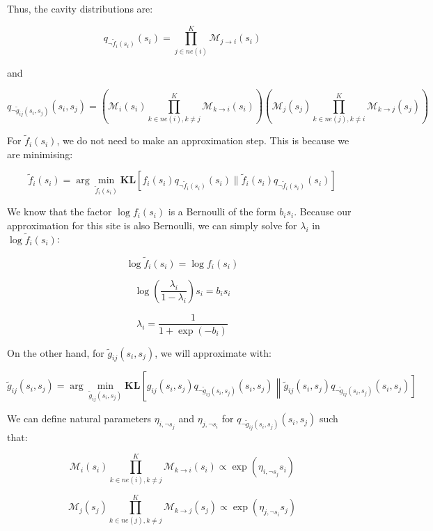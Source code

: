 \documentclass[12pt]{article}
\begin{document}
%

Thus, the cavity distributions are:

\[q_{\neg \tilde{f}_i(s_i)}(s_i) =
\prod_{j\in ne(i)}^{K} \mathcal{M}_{j \rightarrow i}(s_i)
\]

and

\[q_{\neg \tilde{g}_{ij}(s_i, s_j)}(s_i, s_j) = \left( \mathcal{M}_{i}(s_i) \prod_{k\in ne(i), k\neq j}^{K} \mathcal{M}_{k \rightarrow i}(s_i)
\right)\left( \mathcal{M}_{j}(s_j) \prod_{k\in ne(j), k\neq i}^{K} \mathcal{M}_{k \rightarrow j}(s_j)
\right)
\]

For $\tilde{f}_{i}(s_{i})$, we do not need to make an approximation step.
This is because we are minimising:

\[\tilde{f}_{i}(s_{i}) = \arg \min_{\tilde{f}_{i}(s_{i})} \textbf{KL} \left[ f_{i}(s_{i}) q_{\neg \tilde{f}_i(s_i)}(s_i) \| \tilde{f}_{i}(s_{i}) q_{\neg \tilde{f}_i(s_i)}(s_i) \right]\]

We know that the factor $\log f_i(s_i)$ is a Bernoulli of the form $b_i s_i$. Because our approximation for this site is also Bernoulli, we can simply solve for $\lambda_i$ in $\log \tilde{f}_{i}(s_{i})$:

\[\log \tilde{f}_i(s_i) = \log f_{i}(s_{i})\]


\[\log \left(\frac{\lambda_i}{1-\lambda_i} \right)s_i = b_i s_i\]

\[\lambda_i = \frac{1}{1+\exp(-b_i)}\]

On the other hand, for $\tilde{g}_{ij}(s_i, s_j)$, we will approximate with:

\[\tilde{g}_{ij}(s_i, s_j) = \arg \min_{\tilde{g}_{ij}(s_i, s_j)} \textbf{KL} \left[ g_{ij}(s_i, s_j) q_{\neg \tilde{g}_{ij}(s_i, s_j)}(s_i, s_j) \left\| \tilde{g}_{ij}(s_i, s_j) q_{\neg \tilde{g}_{ij}(s_i, s_j)}(s_i, s_j) \right]\]

We can define natural parameters $\eta_{i, \neg s_j}$ and $\eta_{j, \neg s_i}$ for $q_{\neg \tilde{g}_{ij}(s_i, s_j)}(s_i, s_j)$ such that:

\[\mathcal{M}_{i}(s_i) \prod_{k\in ne(i), k\neq j}^{K} \mathcal{M}_{k \rightarrow i}(s_i) \propto \exp(\eta_{i, \neg s_j} s_i)\]

\[ \mathcal{M}_{j}(s_j) \prod_{k\in ne(j), k\neq j}^{K} \mathcal{M}_{k \rightarrow j}(s_j) \propto \exp(\eta_{j, \neg s_i} s_j)\]
\end{document}
